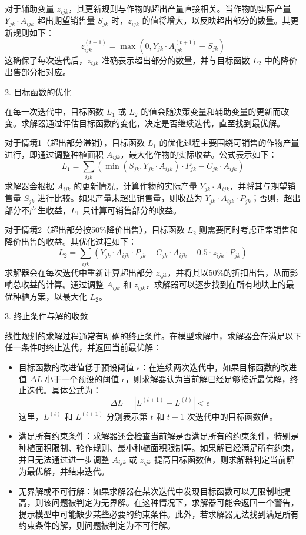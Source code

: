 \documentclass[12pt,a4paper]{nmmcm}
\begin{document}
对于辅助变量 $z_{ijk}$，其更新规则与作物的超出产量直接相关。当作物的实际产量 $Y_{jk} \cdot A_{ijk}$ 超出期望销售量 $S_{jk}$ 时，$z_{ijk}$ 的值将增大，以反映超出部分的数量。其更新规则如下：
\[
z_{ijk}^{(t+1)} = \max(0, Y_{jk} \cdot A_{ijk}^{(t+1)} - S_{jk})
\]
这确保了每次迭代后，$z_{ijk}$ 准确表示超出部分的数量，并与目标函数 $L_2$ 中的降价出售部分相对应。

2. 目标函数的优化

在每一次迭代中，目标函数 $L_1$ 或 $L_2$ 的值会随决策变量和辅助变量的更新而改变。求解器通过评估目标函数的变化，决定是否继续迭代，直至找到最优解。

对于情境1（超出部分滞销），目标函数 $L_1$ 的优化过程主要围绕可销售的作物产量进行，即通过调整种植面积 $A_{ijk}$，最大化作物的实际收益。公式表示如下：
\[
L_1 = \sum_{ijk} \left( \min(S_{jk}, Y_{jk} \cdot A_{ijk}) \cdot P_{jk} - C_{jk} \cdot A_{ijk} \right)
\]
求解器会根据 $A_{ijk}$ 的更新情况，计算作物的实际产量 $Y_{jk} \cdot A_{ijk}$，并将其与期望销售量 $S_{jk}$ 进行比较。如果产量未超出销售量，则收益为 $Y_{jk} \cdot A_{ijk} \cdot P_{jk}$；否则，超出部分不产生收益，$L_1$ 只计算可销售部分的收益。

对于情境2（超出部分按50\%降价出售），目标函数 $L_2$ 则需要同时考虑正常销售和降价出售的收益。其优化过程如下：
\[
L_2 = \sum_{ijk} \left( Y_{jk} \cdot A_{ijk} \cdot P_{jk} - C_{jk} \cdot A_{ijk} - 0.5 \cdot z_{ijk} \cdot P_{jk} \right)
\]
求解器会在每次迭代中重新计算超出部分 $z_{ijk}$，并将其以50\%的折扣出售，从而影响总收益的计算。通过调整 $A_{ijk}$ 和 $z_{ijk}$，求解器可以逐步找到在所有地块上的最优种植方案，以最大化 $L_2$。

 3. 终止条件与解的收敛

线性规划的求解过程通常有明确的终止条件。在模型求解中，求解器会在满足以下任一条件时终止迭代，并返回当前最优解：
\begin{itemize}
    \item 目标函数的改进值低于预设阈值 $\epsilon$：在连续两次迭代中，如果目标函数的改进值 $\Delta L$ 小于一个预设的阈值 $\epsilon$，则求解器认为当前解已经足够接近最优解，终止迭代。具体公式为：
    \[
    \Delta L = |L^{(t+1)} - L^{(t)}| < \epsilon
    \]
    这里，$L^{(t)}$ 和 $L^{(t+1)}$ 分别表示第 $t$ 和 $t+1$ 次迭代中的目标函数值。

    \item 满足所有约束条件：求解器还会检查当前解是否满足所有的约束条件，特别是种植面积限制、轮作规则、最小种植面积限制等。如果解已经满足所有约束，并且无法通过进一步调整 $A_{ijk}$ 或 $z_{ijk}$ 提高目标函数值，则求解器判定当前解为最优解，并结束迭代。

    \item 无界解或不可行解：如果求解器在某次迭代中发现目标函数可以无限制地提高，则该问题被判定为无界解。在这种情况下，求解器可能会返回一个警告，提示模型中可能缺少某些必要的约束条件。此外，若求解器无法找到满足所有约束条件的解，则问题被判定为不可行解。
\end{itemize}
\end{document}
